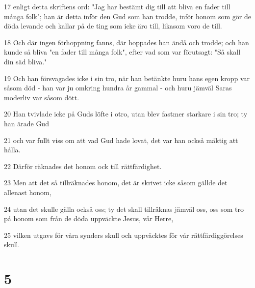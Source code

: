 \par 17 enligt detta skriftens ord: "Jag har bestämt dig till att bliva en fader till många folk"; han är detta inför den Gud som han trodde, inför honom som gör de döda levande och kallar på de ting som icke äro till, likasom voro de till.
\par 18 Och där ingen förhoppning fanns, där hoppades han ändå och trodde; och han kunde så bliva "en fader till många folk", efter vad som var förutsagt: "Så skall din säd bliva."
\par 19 Och han försvagades icke i sin tro, när han betänkte huru hans egen kropp var såsom död - han var ju omkring hundra år gammal - och huru jämväl Saras moderliv var såsom dött.
\par 20 Han tvivlade icke på Guds löfte i otro, utan blev fastmer starkare i sin tro; ty han ärade Gud
\par 21 och var fullt viss om att vad Gud hade lovat, det var han också mäktig att hålla.
\par 22 Därför räknades det honom ock till rättfärdighet.
\par 23 Men att det så tillräknades honom, det är skrivet icke såsom gällde det allenast honom,
\par 24 utan det skulle gälla också oss; ty det skall tillräknas jämväl oss, oss som tro på honom som från de döda uppväckte Jesus, vår Herre,
\par 25 vilken utgavs för våra synders skull och uppväcktes för vår rättfärdiggörelses skull.

\chapter{5}

